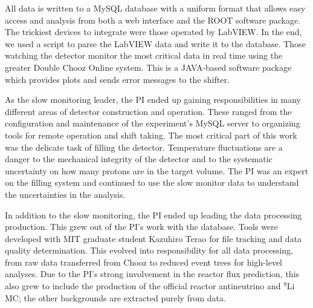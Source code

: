 All data is written to a MySQL database with a uniform format that allows easy access and analysis from both a web interface and the ROOT software package. The trickiest devices to integrate were those operated by LabVIEW. In the end, we used a script to parse the LabVIEW data and write it to the database. Those watching the detector monitor the most critical data in real time using the greater Double Chooz Online system. This is a JAVA-based software package which provides plots and sends error messages to the shifter. 

As the slow monitoring leader, the PI  ended up gaining responsibilities in many different areas of detector construction and operation.  These ranged from the configuration and maintenance of the experiment's MySQL server to organizing tools for remote operation and shift taking. The most critical part of this work was the delicate task of filling the detector. Temperature fluctuations are a danger to the mechanical integrity of the detector and to the systematic uncertainty on how many protons are in the target volume. The PI was an expert on the filling system and continued to use the slow monitor data to understand the uncertainties in the analysis.

In addition to the slow monitoring, the PI ended up leading the data processing production. This grew out of the PI's work with the database. Tools were developed with MIT graduate student Kazuhiro Terao for file tracking and data quality determination. This evolved into responsibility for all data processing, from raw data transferred from Chooz to reduced event trees for high-level analyses. Due to the PI's strong involvement in the reactor flux prediction, this also grew to include the production of the official reactor antineutrino and $^{9}$Li MC; the other backgrounds are extracted purely from data.

